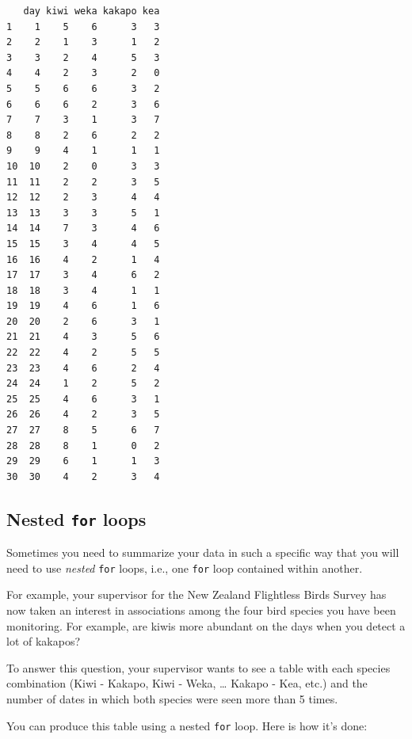 \documentclass[
]{book}
\begin{document}
\begin{verbatim}
   day kiwi weka kakapo kea
1    1    5    6      3   3
2    2    1    3      1   2
3    3    2    4      5   3
4    4    2    3      2   0
5    5    6    6      3   2
6    6    6    2      3   6
7    7    3    1      3   7
8    8    2    6      2   2
9    9    4    1      1   1
10  10    2    0      3   3
11  11    2    2      3   5
12  12    2    3      4   4
13  13    3    3      5   1
14  14    7    3      4   6
15  15    3    4      4   5
16  16    4    2      1   4
17  17    3    4      6   2
18  18    3    4      1   1
19  19    4    6      1   6
20  20    2    6      3   1
21  21    4    3      5   6
22  22    4    2      5   5
23  23    4    6      2   4
24  24    1    2      5   2
25  25    4    6      3   1
26  26    4    2      3   5
27  27    8    5      6   7
28  28    8    1      0   2
29  29    6    1      1   3
30  30    4    2      3   4
\end{verbatim}

\hypertarget{nested-for-loops}{%
\subsection*{\texorpdfstring{Nested \texttt{for} loops}{Nested for loops}}\label{nested-for-loops}}

Sometimes you need to summarize your data in such a specific way that you will need to use \emph{nested} \texttt{for} loops, i.e., one \texttt{for} loop contained within another.

For example, your supervisor for the New Zealand Flightless Birds Survey has now taken an interest in associations among the four bird species you have been monitoring. For example, are kiwis more abundant on the days when you detect a lot of kakapos?

To answer this question, your supervisor wants to see a table with each species combination (Kiwi - Kakapo, Kiwi - Weka, \ldots{} Kakapo - Kea, etc.) and the number of dates in which both species were seen more than 5 times.

You can produce this table using a nested \texttt{for} loop. Here is how it's done:
\end{document}

